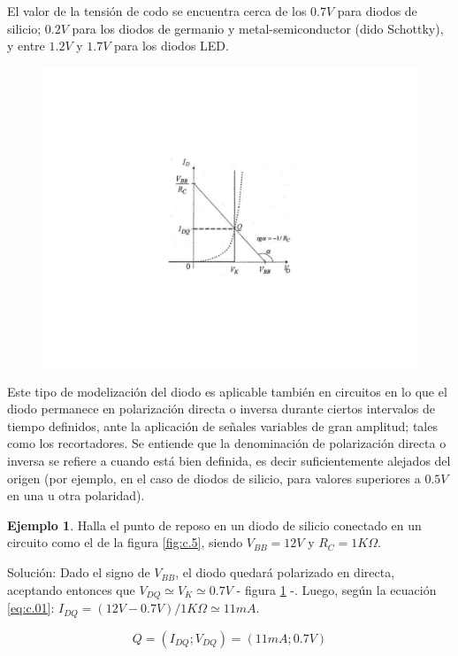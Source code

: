 \documentclass{book} %
\theoremstyle{definition}
\newtheorem{exmp}{Ejemplo}[]
\theoremstyle{definition}
\begin{document}
\begin{appendices}
El valor de la tensión de codo se encuentra cerca de los $0.7V$ para diodos de silicio; $0.2V$ para los diodos de germanio y metal-semiconductor (dido Schottky), y entre $1.2V$ y $1.7V$ para los diodos LED.
\begin{figure}[!htbp]
    \centering
    \includegraphics[scale=1]{figurac07.pdf}
    \caption{}
    \label{fig:c.7}
\end{figure}


Este tipo de modelización del diodo es aplicable también en circuitos en lo que el diodo permanece en polarización directa o inversa durante ciertos intervalos de tiempo definidos, ante la aplicación de señales variables de gran amplitud; tales como los recortadores. Se entiende que la denominación de polarización directa o inversa se refiere a cuando está bien definida, es decir suficientemente alejados del origen (por ejemplo, en el caso de diodos de silicio, para valores superiores a $0.5V$ en una u otra polaridad).

\begin{exmp}
Halla el punto de reposo en un diodo de silicio conectado en un circuito como el de la figura \ref{fig:c.5}, siendo $V_{BB}=12V$ y $R_C=1K\Omega$.

Solución: Dado el signo de $V_{BB}$, el diodo quedará polarizado en directa, aceptando entonces que $V_{DQ}\simeq V_K \simeq 0.7V$ - figura \ref{fig:c.7} -. Luego, según la ecuación \ref{eq:c.01}: $I_{DQ}=(12V-0.7V)/1K\Omega\simeq 11mA$.

\[Q=(I_{DQ};V_{DQ})=(11mA; 0.7V)\]
\end{exmp}


\end{appendices}
\end{document}
